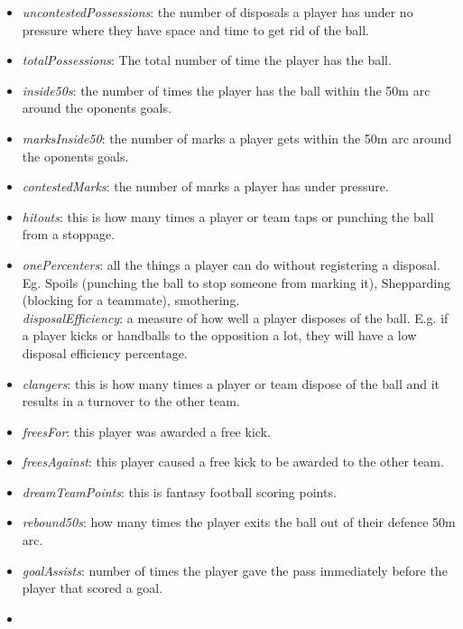 \begin{itemize}
\item
  \emph{uncontestedPossessions}: the number of disposals a player has
  under no pressure where they have space and time to get rid of the
  ball.\\
\item
  \emph{totalPossessions}: The total number of time the player has the
  ball.
\item
  \emph{inside50s}: the number of times the player has the ball within
  the 50m arc around the oponents goals.\\
\item
  \emph{marksInside50}: the number of marks a player gets within the 50m
  arc around the oponents goals.\\
\item
  \emph{contestedMarks}: the number of marks a player has under
  pressure.
\item
  \emph{hitouts}: this is how many times a player or team taps or
  punching the ball from a stoppage.
\item
  \emph{onePercenters}: all the things a player can do without
  registering a disposal. Eg. Spoils (punching the ball to stop someone
  from marking it), Shepparding (blocking for a teammate), smothering.\\
  \emph{disposalEfficiency}: a measure of how well a player disposes of
  the ball. E.g. if a player kicks or handballs to the opposition a lot,
  they will have a low disposal efficiency percentage.\\
\item
  \emph{clangers}: this is how many times a player or team dispose of
  the ball and it results in a turnover to the other team.\\
\item
  \emph{freesFor}: this player was awarded a free kick.\\
\item
  \emph{freesAgainst}: this player caused a free kick to be awarded to
  the other team.\\
\item
  \emph{dreamTeamPoints}: this is fantasy football scoring points.\\
\item
  \emph{rebound50s}: how many times the player exits the ball out of
  their defence 50m arc.\\
\item
  \emph{goalAssists}: number of times the player gave the pass
  immediately before the player that scored a goal.
\item

\end{itemize}
